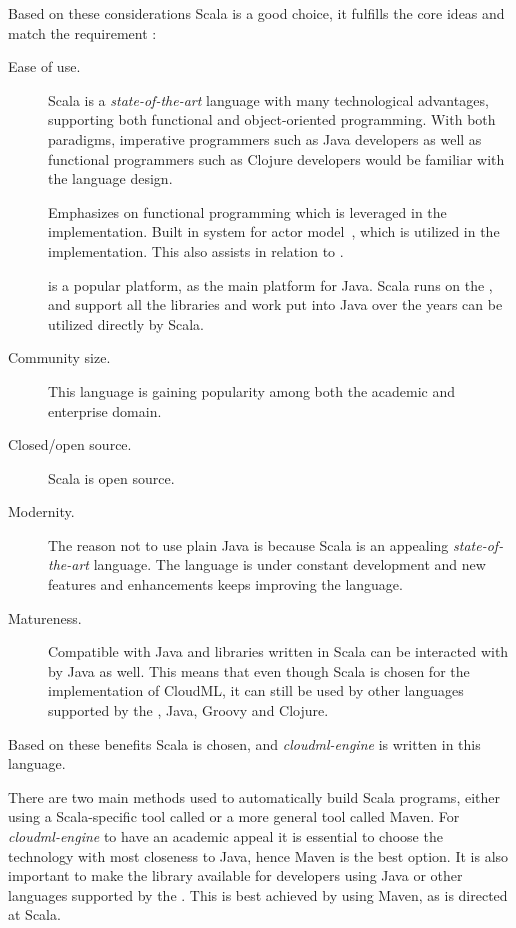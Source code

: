 Based on these considerations Scala is a good choice, it fulfills the core ideas and match
the requirement :
\begin{description} 
  \item[Ease of use.]
    Scala is a \emph{state-of-the-art} language with many technological advantages,
    \eg supporting both functional and object-oriented programming.
    With both paradigms, imperative programmers such as Java developers as well as functional
    programmers such as Clojure developers would be familiar with the language design.
    
    Emphasizes on functional programming which is leveraged in the implementation.
    Built in system for actor model~\cite{actors:haller07}, which is utilized in the implementation.
    This also assists in relation to .

     is a popular platform, as the main platform for Java.
    Scala runs on the , and support all the libraries and work put into Java
    over the years can be utilized directly by Scala.
  \item[Community size.]
    This language is gaining popularity among both the academic and enterprise domain.
  \item[Closed/open source.] Scala is open source.
  \item[Modernity.]
    The reason not to use plain Java is because Scala is an appealing \emph{state-of-the-art} language.
    The language is under constant development and new features and enhancements keeps improving
    the language.
  \item[Matureness.]
    Compatible with Java and libraries written in Scala can be interacted with by Java as well.
    This means that even though Scala is chosen for the implementation of CloudML,
    it can still be used by other languages supported by the ,
    \eg Java, Groovy and Clojure.
\end{description}
Based on these benefits Scala is chosen, and \emph{cloudml-engine} is written in this language.






There are two main methods used to automatically build Scala programs, 
either using a Scala-specific tool called  or a more general tool called Maven. 
For \emph{cloudml-engine} to have an academic appeal it is essential to choose the technology
with most closeness to Java, hence Maven is the best option.
It is also important to make the library available for developers using Java or other
languages supported by the .
This is best achieved by using Maven, as  is directed at Scala.

